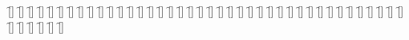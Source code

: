\begin{questions}
\begin{multicols}{2}
        \question  \f[]
        \question  \f[]
        \question  \f[]
        \question  \f[]
        \question  \f[]
        \question  \f[]
        \question  \f[]
        \question  \f[]
        \question  \f[]
        \question  \f[]
        \question  \f[]
        \question  \f[]
        \question  \f[]
        \question  \f[]
        \question  \f[]
        \question  \f[]
        \question  \f[]
        \question  \f[]
        \question  \f[]
        \question  \f[]
        \question  \f[]
        \question  \f[]
        \question  \f[]
        \question  \f[]
        \question  \f[]
        \question  \f[]
        \question  \f[]
        \question  \f[]
        \question  \f[]
        \question  \f[]
        \question  \f[]
        \question  \f[]
        \question  \f[]
        \question  \f[]
        \question  \f[]
        \question  \f[]
        \question  \f[]
        \question  \f[]
        \question  \f[]
        \question  \f[]
        \question  \f[]
        \question  \f[]
        \question  \f[]
        \question  \f[]
        \question  \f[]
        \question  \f[]
    \end{multicols}
\end{questions}
